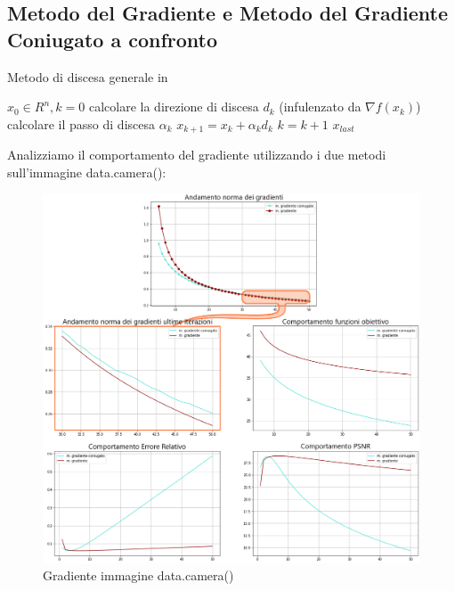 {\color{oorange}\subsection{Metodo del Gradiente e Metodo del Gradiente Coniugato a confronto}}

\begin{algorithm}[H]
	\caption*{Metodo di discesa generale in }\label{alg:mg}
	\begin{algorithmic}[1]
		\State $x_0 \in R^n, k=0$
            \State calcolare la direzione di discesa $d_k$ (infulenzato da $\nabla f(x_k)$)
            \State calcolare il passo di discesa $\alpha_k$
            \State $x_{k+1} = x_k+\alpha_kd_k$
            \State $k = k+1$
        \EndWhile
        \State \Return $x_{last}$
	\end{algorithmic}
\end{algorithm}

Analizziamo il comportamento del gradiente utilizzando i due metodi sull'immagine data.camera():
\begin{figure}[H]
    \centering
    \includegraphics[width=\textwidth]{output/MGCvsMG-enph.png}
    \caption{Gradiente immagine data.camera()}
    \label{fig:MGCvsMGdatacamera}
\end{figure}

